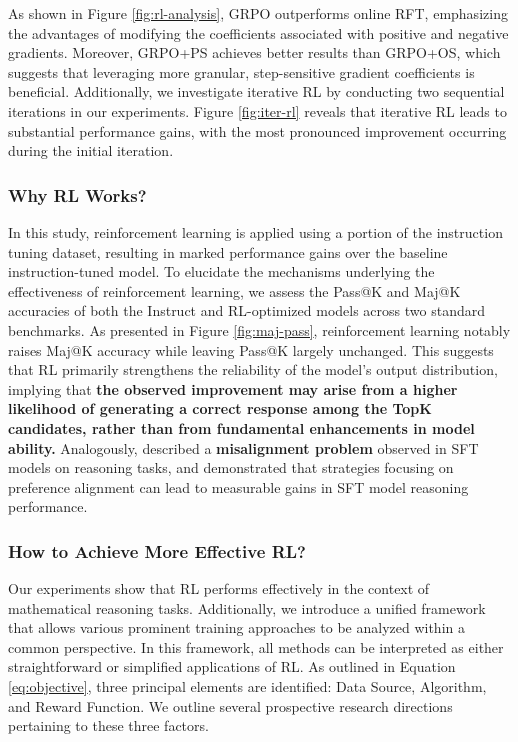 \begin{itemize}[topsep=0pt]
\begin{itemize}[topsep=0pt]
As shown in Figure \ref{fig:rl-analysis}, GRPO outperforms online RFT, emphasizing the advantages of modifying the coefficients associated with positive and negative gradients. Moreover, GRPO+PS achieves better results than GRPO+OS, which suggests that leveraging more granular, step-sensitive gradient coefficients is beneficial. Additionally, we investigate iterative RL by conducting two sequential iterations in our experiments. Figure \ref{fig:iter-rl} reveals that iterative RL leads to substantial performance gains, with the most pronounced improvement occurring during the initial iteration.

\subsubsection{Why RL Works?} In this study, reinforcement learning is applied using a portion of the instruction tuning dataset, resulting in marked performance gains over the baseline instruction-tuned model. To elucidate the mechanisms underlying the effectiveness of reinforcement learning, we assess the Pass@K and Maj@K accuracies of both the Instruct and RL-optimized models across two standard benchmarks. As presented in Figure \ref{fig:maj-pass}, reinforcement learning notably raises Maj@K accuracy while leaving Pass@K largely unchanged. This suggests that RL primarily strengthens the reliability of the model's output distribution, implying that \textbf{the observed improvement may arise from a higher likelihood of generating a correct response among the TopK candidates, rather than from fundamental enhancements in model ability.} Analogously, \citep{wang2023making} described a \textbf{misalignment problem} observed in SFT models on reasoning tasks, and demonstrated that strategies focusing on preference alignment \citep{yuan2023rrhf,song2023preference,wang2023making} can lead to measurable gains in SFT model reasoning performance.

\subsubsection{How to Achieve More Effective RL?}
\label{sec:effec_rl}
Our experiments show that RL performs effectively in the context of mathematical reasoning tasks. Additionally, we introduce a unified framework that allows various prominent training approaches to be analyzed within a common perspective. In this framework, all methods can be interpreted as either straightforward or simplified applications of RL. As outlined in Equation \ref{eq:objective}, three principal elements are identified: Data Source, Algorithm, and Reward Function. We outline several prospective research directions pertaining to these three factors.


\end{itemize}
\end{itemize}
